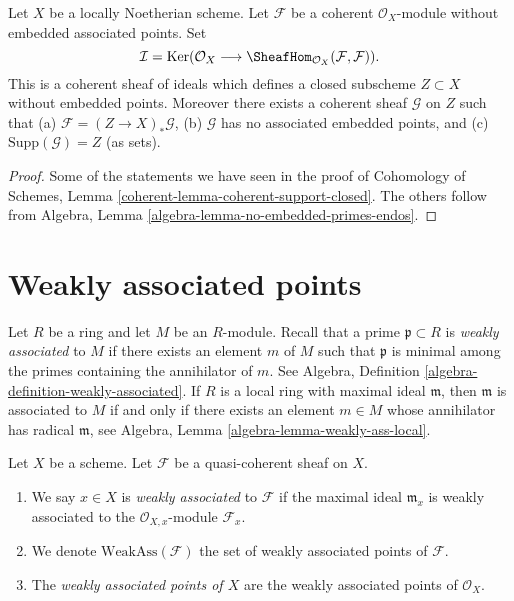 \begin{lemma}
\label{lemma-no-embedded-points-endos}
Let $X$ be a locally Noetherian scheme.
Let $\mathcal{F}$ be a coherent $\mathcal{O}_X$-module
without embedded associated points. Set
$$
\mathcal{I}
=
\text{Ker}(\mathcal{O}_X
\longrightarrow
\SheafHom_{\mathcal{O}_X}(\mathcal{F}, \mathcal{F})).
$$
This is a coherent sheaf of ideals which defines a closed
subscheme $Z \subset X$ without embedded points. Moreover
there exists a coherent sheaf $\mathcal{G}$ on $Z$
such that (a) $\mathcal{F} = (Z \to X)_*\mathcal{G}$,
(b) $\mathcal{G}$ has no associated embedded points, and
(c) $\text{Supp}(\mathcal{G}) = Z$ (as sets).
\end{lemma}

\begin{proof}
Some of the statements we have seen in the proof of
Cohomology of Schemes, Lemma \ref{coherent-lemma-coherent-support-closed}.
The others follow from
Algebra, Lemma \ref{algebra-lemma-no-embedded-primes-endos}.
\end{proof}



\section{Weakly associated points}
\label{section-weakly-associated}

\noindent
Let $R$ be a ring and let $M$ be an $R$-module.
Recall that a prime $\mathfrak p \subset R$ is {\it weakly associated}
to $M$ if there exists an element $m$ of $M$ such that $\mathfrak p$ is
minimal among the primes containing the annihilator of $m$. See
Algebra, Definition \ref{algebra-definition-weakly-associated}.
If $R$ is a local ring with maximal ideal $\mathfrak m$, then
$\mathfrak m$ is associated to $M$ if and only if there exists an
element $m \in M$ whose annihilator has radical $\mathfrak m$, see
Algebra, Lemma \ref{algebra-lemma-weakly-ass-local}.

\begin{definition}
\label{definition-weakly-associated}
Let $X$ be a scheme.
Let $\mathcal{F}$ be a quasi-coherent sheaf on $X$.
\begin{enumerate}
\item We say $x \in X$ is {\it weakly associated} to $\mathcal{F}$
if the maximal ideal $\mathfrak m_x$ is weakly associated to the
$\mathcal{O}_{X, x}$-module $\mathcal{F}_x$.
\item We denote $\text{WeakAss}(\mathcal{F})$ the set of weakly associated
points of $\mathcal{F}$.
\item The {\it weakly associated points of $X$} are the weakly associated
points of $\mathcal{O}_X$.
\end{enumerate}
\end{definition}

